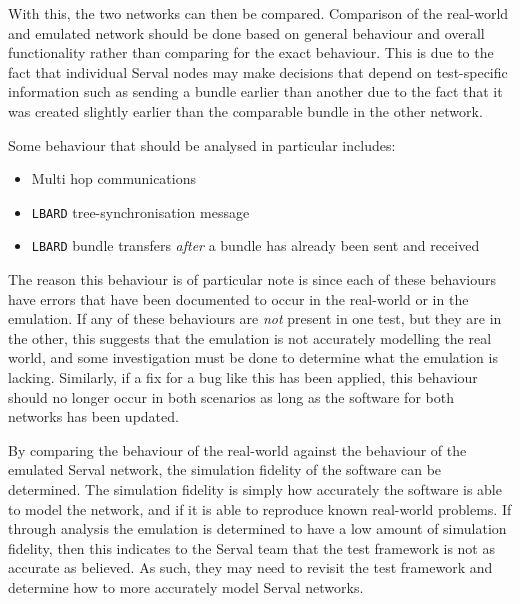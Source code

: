 With this, the two networks can then be compared.
Comparison of the real-world and emulated network should be done based on general behaviour and overall functionality rather than comparing for the exact behaviour.
This is due to the fact that individual Serval nodes may make decisions that depend on test-specific information such as sending a bundle earlier than another due to the fact that it was created slightly earlier than the comparable bundle in the other network.

Some behaviour that should be analysed in particular includes:
\begin{itemize}
    \item Multi hop communications
    \item \texttt{LBARD} tree-synchronisation message
    \item \texttt{LBARD} bundle transfers \emph{after} a bundle has already been sent and received
\end{itemize}

The reason this behaviour is of particular note is since each of these behaviours have errors that have been documented to occur in the real-world or in the emulation.
If any of these behaviours are \emph{not} present in one test, but they are in the other, this suggests that the emulation is not accurately modelling the real world, and some investigation must be done to determine what the emulation is lacking.
Similarly, if a fix for a bug like this has been applied, this behaviour should no longer occur in both scenarios as long as the software for both networks has been updated.


By comparing the behaviour of the real-world against the behaviour of the emulated Serval network, the simulation fidelity of the software can be determined.
The simulation fidelity is simply how accurately the software is able to model the network, and if it is able to reproduce known real-world problems.
If through analysis the emulation is determined to have a low amount of simulation fidelity, then this indicates to the Serval team that the test framework is not as accurate as believed.
As such, they may need to revisit the test framework and determine how to more accurately model Serval networks.

